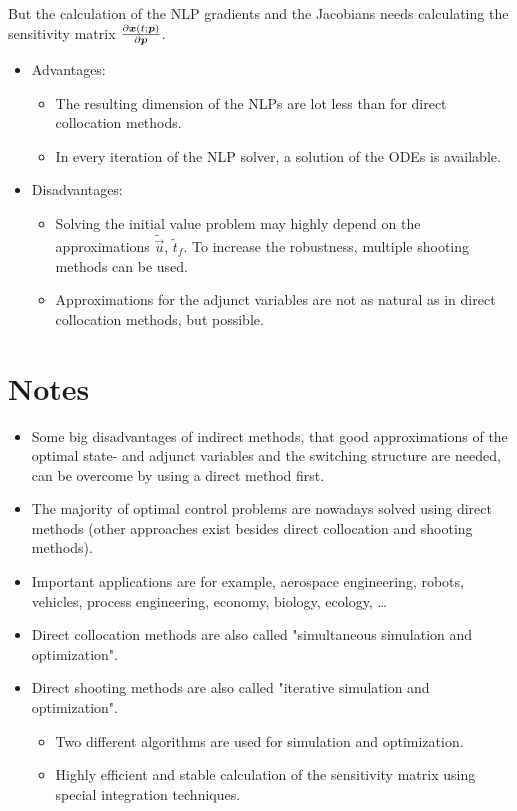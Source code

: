 			But the calculation of the NLP gradients and the Jacobians needs calculating the sensitivity matrix \( \pdv{\bm{x}(t; \bm{p})}{\bm{p}} \).
			\begin{itemize}
				\item Advantages:
					\begin{itemize}
						\item The resulting dimension of the NLPs are lot less than for direct collocation methods.
						\item In every iteration of the NLP solver, a solution of the ODEs is available.
					\end{itemize}
				\item Disadvantages:
					\begin{itemize}
						\item Solving the initial value problem may highly depend on the approximations \( \tilde{\vec{u}} \), \( \tilde{t}_f \). To increase the robustness, multiple shooting methods can be used.
						\item Approximations for the adjunct variables are not as natural as in direct collocation methods, but possible.
					\end{itemize}
			\end{itemize}

	\section{Notes}
		\begin{itemize}
			\item Some big disadvantages of indirect methods, that good approximations of the optimal state- and adjunct variables and the switching structure are needed, can be overcome by using a direct method first.
			\item The majority of optimal control problems are nowadays solved using direct methods (other approaches exist besides direct collocation and shooting methods).
			\item Important applications are for example, aerospace engineering, robots, vehicles, process engineering, economy, biology, ecology, \dots
			\item Direct collocation methods are also called "simultaneous simulation and optimization".
			\item Direct shooting methods are also called "iterative simulation and optimization".
				\begin{itemize}
					\item Two different algorithms are used for simulation and optimization.
					\item Highly efficient and stable calculation of the sensitivity matrix using special integration techniques.
				\end{itemize}
		\end{itemize}


